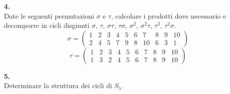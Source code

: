 \documentclass[italian,a4paper,11pt]
{article}
\begin{document}
\vspace{0.4cm}
\noindent
\begin{Ex}\textbf{ 4.}\\
Date le seguenti permutazioni $\sigma$ e $\tau$, calcolare i prodotti dove necessario e decomporre in cicli disgiunti $\sigma$, $\tau$, $\sigma\tau$, $\tau\sigma$, $\sigma^2$, $\sigma^2\tau$, $\tau^2$, $\tau^2\sigma$.
$$\sigma=\left(\begin{array}{cccccccccc} 1 & 2 & 3 & 4 & 5 & 6 & 7 & 8 & 9 & 10 \\ 2 & 4 & 5 & 7 & 9 & 8 & 10 & 6 & 3 & 1 \end{array} \right )$$
$$\tau=\left(\begin{array}{cccccccccc} 1 & 2 & 3 & 4 & 5 & 6 & 7 & 8 & 9 & 10 \\ 1 & 3 & 2 & 4 & 5 & 6 & 7 & 8 & 9 & 10 \end{array} \right )$$
\end{Ex}

\vspace{0.4cm}
\noindent
\begin{Ex}\textbf{ 5.}\\
Determinare la struttura dei cicli di $S_5$.
\end{Ex}
\end{document}
